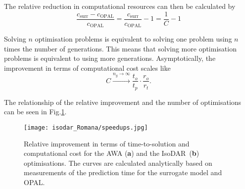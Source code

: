 \documentclass[a4paper, 12pt, version-1-compatibility]{article}
\def\isodar{IsoDAR}
\def\opal{OPAL}
\newcommand{\figref}[1]{Fig.\xspace\ref{#1}}
\begin{document}
The relative reduction in computational resources can then be calculated by
\begin{equation}
    \frac{c_\mathrm{surr} - c_\mathrm{\opal}}{c_\mathrm{\opal}} = \frac{c_\mathrm{surr}}{c_\mathrm{\opal}} - 1 = \frac{1}{C} - 1
    \label{equ:cost_reduction}
\end{equation}

Solving $n$ optimisation problems is equivalent to solving one problem using $n$ times the number of generations. This means that solving more optimisation problems is equivalent to using more generations. Asymptotically, the improvement in terms of computational cost scales like
\begin{equation*}
    C \xrightarrow{n_g \to \infty} \frac{t_o}{t_p} \cdot \frac{r_o}{r_t}.
\end{equation*}

The relationship of the relative improvement and the number of optimisations can be seen in \figref{fig:speedup}.
\begin{figure}[!ht]
    \centering
    \texttt{[image: isodar\_Romana/speedups.jpg]}
    \caption{Relative improvement in terms of time-to-solution and computational cost for the AWA (\textbf{a}) and the \isodar\ (\textbf{b}) optimisations. The curves are calculated analytically based on measurements of the prediction time for the surrogate model and \opal. }
    \label{fig:speedup}
\end{figure}
\end{document}
